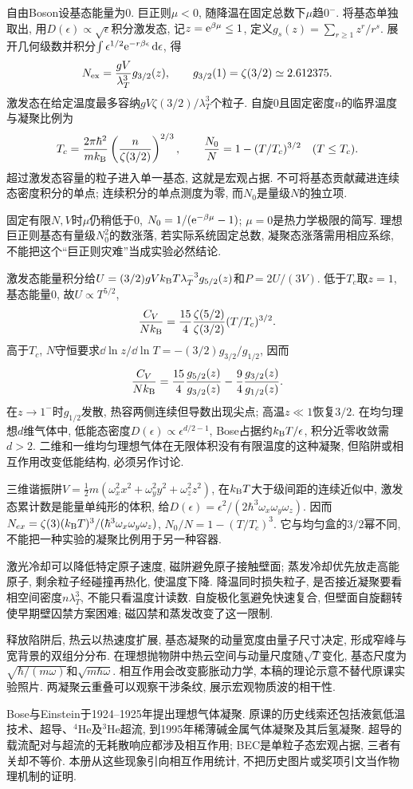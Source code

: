 \label{ch:bose}
自由Boson设基态能量为0. 巨正则$\mu<0$, 随降温在固定总数下$\mu$趋$0^-$. 将基态单独取出, 用$D(\epsilon)\propto\sqrt\epsilon$积分激发态, 记$z=\mathrm e^{\beta\mu}\le1$, 定义$g_s(z)=\sum_{r\ge1}z^r/r^s$. 展开几何级数并积分$\int\epsilon^{1/2}\mathrm e^{-r\beta\epsilon}\,\mathrm d\epsilon$, 得
\[
N_{\rm ex}=\frac{gV}{\lambda_T^3}g_{3/2}(z),\qquad
g_{3/2}(1)=\zeta(3/2)\simeq2.612375.
\]
激发态在给定温度最多容纳$gV\zeta(3/2)/\lambda_T^3$个粒子. 自旋0且固定密度$n$的临界温度与凝聚比例为
\[
T_c=\frac{2\pi\hbar^2}{mk_{\mathrm B}}\left(\frac n{\zeta(3/2)}\right)^{2/3},\qquad
\frac{N_0}N=1-(T/T_c)^{3/2}\quad(T\le T_c).
\]
超过激发态容量的粒子进入单一基态, 这就是宏观占据. 不可将基态贡献藏进连续态密度积分的单点; 连续积分的单点测度为零, 而$N_0$是量级$N$的独立项.

固定有限$N,V$时$\mu$仍稍低于0, $N_0=1/(\mathrm e^{-\beta\mu}-1)$; $\mu=0$是热力学极限的简写. 理想巨正则基态有量级$N_0^2$的数涨落, 若实际系统固定总数, 凝聚态涨落需用相应系综, 不能把这个“巨正则灾难”当成实验必然结论.

激发态能量积分给$U=(3/2)gVk_{\mathrm B} T\lambda_T^{-3}g_{5/2}(z)$和$P=2U/(3V)$. 低于$T_c$取$z=1$, 基态能量0, 故$U\propto T^{5/2}$,
\[
\frac{C_V}{Nk_{\mathrm B}}=\frac{15}{4}\frac{\zeta(5/2)}{\zeta(3/2)}(T/T_c)^{3/2}.
\]
高于$T_c$, $N$守恒要求$\dd\ln z/\dd\ln T=-(3/2)g_{3/2}/g_{1/2}$, 因而
\[
\frac{C_V}{Nk_{\mathrm B}}=\frac{15}{4}\frac{g_{5/2}(z)}{g_{3/2}(z)}
-\frac94\frac{g_{3/2}(z)}{g_{1/2}(z)}.
\]
在$z\to1^-$时$g_{1/2}$发散, 热容两侧连续但导数出现尖点; 高温$z\ll1$恢复$3/2$. 在均匀理想$d$维气体中, 低能态密度$D(\epsilon)\propto\epsilon^{d/2-1}$, Bose占据约$k_{\mathrm B} T/\epsilon$, 积分近零收敛需$d>2$. 二维和一维均匀理想气体在无限体积没有有限温度的这种凝聚, 但陷阱或相互作用改变低能结构, 必须另作讨论.

三维谐振阱$V=\frac12m(\omega_x^2x^2+\omega_y^2y^2+\omega_z^2z^2)$, 在$k_{\mathrm B} T$大于级间距的连续近似中, 激发态累计数是能量单纯形的体积, 给$D(\epsilon)=\epsilon^2/(2\hbar^3\omega_x\omega_y\omega_z)$. 因而$N_{ex}=\zeta(3)(k_{\mathrm B} T)^3/(\hbar^3\omega_x\omega_y\omega_z)$, $N_0/N=1-(T/T_c)^3$. 它与均匀盒的$3/2$幂不同, 不能把一种实验的凝聚比例用于另一种容器.

激光冷却可以降低特定原子速度, 磁阱避免原子接触壁面; 蒸发冷却优先放走高能原子, 剩余粒子经碰撞再热化, 使温度下降. 降温同时损失粒子, 是否接近凝聚要看相空间密度$n\lambda_T^3$, 不能只看温度计读数. 自旋极化氢避免快速复合, 但壁面自旋翻转使早期壁囚禁方案困难; 磁囚禁和蒸发改变了这一限制.

释放陷阱后, 热云以热速度扩展, 基态凝聚的动量宽度由量子尺寸决定, 形成窄峰与宽背景的双组分分布. 在理想抛物阱中热云空间与动量尺度随$\sqrt T$变化, 基态尺度为$\sqrt{\hbar/(m\omega)}$和$\sqrt{m\hbar\omega}$. 相互作用会改变膨胀动力学, 本稿的理论示意不替代原课实验照片. 两凝聚云重叠可以观察干涉条纹, 展示宏观物质波的相干性.

Bose与Einstein于1924--1925年提出理想气体凝聚. 原课的历史线索还包括液氦低温技术、超导、${}^4$He及${}^3$He超流, 到1995年稀薄碱金属气体凝聚及其后氢凝聚. 超导的载流配对与超流的无耗散响应都涉及相互作用; BEC是单粒子态宏观占据, 三者有关却不等价. 本册从这些现象引向相互作用统计, 不把历史图片或奖项引文当作物理机制的证明.
